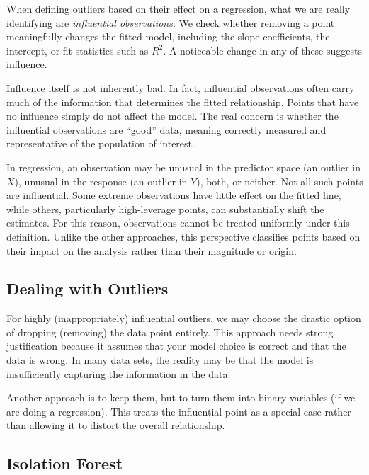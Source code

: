 When defining outliers based on their effect on a regression, what we are really identifying are \textit{influential observations}. We check whether removing a point meaningfully changes the fitted model, including the slope coefficients, the intercept, or fit statistics such as $R^2$. A noticeable change in any of these suggests influence.

Influence itself is not inherently bad. In fact, influential observations often carry much of the information that determines the fitted relationship. Points that have no influence simply do not affect the model. The real concern is whether the influential observations are “good” data, meaning correctly measured and representative of the population of interest.

In regression, an observation may be unusual in the predictor space (an outlier in $X$), unusual in the response (an outlier in $Y$), both, or neither. Not all such points are influential. Some extreme observations have little effect on the fitted line, while others, particularly high-leverage points, can substantially shift the estimates. For this reason, observations cannot be treated uniformly under this definition. Unlike the other approaches, this perspective classifies points based on their impact on the analysis rather than their magnitude or origin.

\bigskip

\subsection{Dealing with Outliers}

\medskip

For highly (inappropriately) influential outliers, we may choose the drastic option of dropping (removing) the data point entirely. This approach needs strong justification because it assumes that your model choice is correct and that the data is wrong. In many data sets, the reality may be that the model is insufficiently capturing the information in the data. 

Another approach is to keep them, but to turn them into binary variables (if we are doing a regression). This treats the influential point as a special case rather than allowing it to distort the overall relationship.

\bigskip

\subsection{Isolation Forest}

